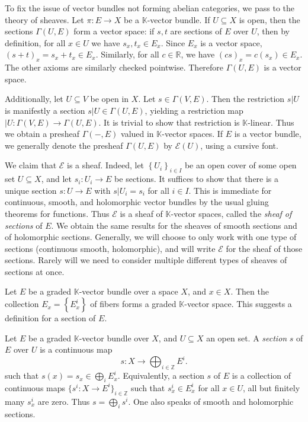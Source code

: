 \begin{construction}\label{4.1.14}
	To fix the issue of vector bundles not forming abelian categories, we pass to the theory of sheaves. Let $\pi : E \to X$ be a $\mathbb{K} $-vector bundle. If $U\subseteq X$ is open, then the sections $\Gamma (U,E)$ form a vector space: if $s,t$ are sections of $E$ over $U$, then by definition, for all $x\in U$ we have $s_x,t_x\in E_x$. Since $E_x$ is a vector space, $(s+t)_x = s_x + t_x\in E_x$. Similarly, for all $c\in\mathbb{R}$, we have $(cs)_x = c(s_x)\in E_x$. The other axioms are similarly checked pointwise. Therefore $\Gamma (U,E)$ is a vector space.
	
	Additionally, let $U\subseteq V$ be open in $X$. Let $s\in \Gamma (V,E)$. Then the restriction $s|U$ is manifestly a section $s|U\in \Gamma (U,E)$, yielding a restriction map $|U : \Gamma (V,E) \to \Gamma (U,E)$. It is trivial to show that restriction is $\mathbb{K} $-linear. Thus we obtain a presheaf $\Gamma (-,E)$ valued in $\mathbb{K} $-vector spaces. If $E$ is a vector bundle, we generally denote the presheaf $\Gamma (U,E)$ by $\mathcal{E}(U)$, using a cursive font.

	We claim that $\mathcal{E} $ is a sheaf. Indeed, let $\left\{ U_i \right\} _{i\in I} $ be an open cover of some open set $U\subseteq X$, and let $s_i : U_i \to E$ be sections. It suffices to show that there is a unique section $s : U \to E$ with $s|U_i = s_i$ for all $i\in I$. This is immediate for continuous, smooth, and holomorphic vector bundles by the usual gluing theorems for functions. Thus $\mathcal{E} $ is a sheaf of $\mathbb{K} $-vector spaces, called the \emph{sheaf of sections} of $E$. We obtain the same results for the sheaves of smooth sections and of holomorphic sections. Generally, we will choose to only work with one type of sections (continuous smooth, holomorphic), and will write $\mathcal{E} $ for the sheaf of those sections. Rarely will we need to consider multiple different types of sheaves of sections at once.
\end{construction}

\begin{remark}\label{rmk:4.1.15}
	Let $E$ be a graded $\mathbb{K} $-vector bundle over a space $X$, and $x\in X$. Then the collection $E_x=\left\{ E^i_x \right\} $ of fibers forms a graded $\mathbb{K} $-vector space. This suggests a definition for a section of $E$.
\end{remark}

\begin{definition}\label{dfn:4.1.16}
	Let $E$ be a graded $\mathbb{K} $-vector bundle over $X$, and $U\subseteq X$ an open set. A \emph{section} $s$ of $E$ over $U$ is a continuous map
	\[
		s : X \to \bigoplus_{i\in\mathbb{Z} } E^i
	.\]
	such that $s(x)=s_x\in \bigoplus_{i} E^i_x$. Equivalently, a section $s$ of $E$ is a collection of continuous maps $\{s^i : X \to E^i\}_{i\in\mathbb{Z} } $ such that $s^i_x\in E^i_x$ for all $x\in U$, all but finitely many $s^i_x$ are zero. Thus $s = \bigoplus_{i} s^i$. One also speaks of smooth and holomorphic sections.
\end{definition}

